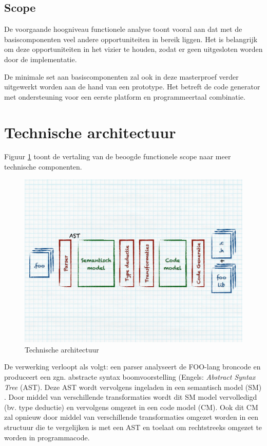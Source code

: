\subsection{Scope}
\label{subsection:arch-scope}

De voorgaande hoogniveau functionele analyse toont vooral aan dat met de
basiscomponenten veel andere opportuniteiten in bereik liggen. Het is
belangrijk om deze opportuniteiten in het vizier te houden, zodat er geen
uitgesloten worden door de implementatie.

De minimale set aan basiscomponenten zal ook in deze masterproef verder uitgewerkt
worden aan de hand van een prototype. Het betreft de code generator met
ondersteuning voor een eerste platform en programmeertaal combinatie.

\section{Technische architectuur}
\label{section:arch-technical}

Figuur \ref{fig:arch-technical} toont de vertaling van de beoogde functionele
scope naar meer technische componenten. 

\begin{figure}[ht]
  \centering
  \includegraphics[width=0.9\linewidth]{resources/arch-technical.pdf}
  \caption{Technische architectuur}
  \label{fig:arch-technical}
\end{figure}

De verwerking verloopt als volgt: een parser analyseert de FOO-lang broncode en
produceert een zgn. abstracte syntax boomvoorstelling (Engels: \emph{Abstract
Syntax Tree} (AST). Deze AST wordt vervolgens ingeladen in een semantisch model
(SM) \citep{fowler2010domain}. Door middel van verschillende transformaties
wordt dit SM model vervolledigd (bv. type deductie) en vervolgens omgezet in
een code model (CM). Ook dit CM zal opnieuw door middel van verschillende
transformaties omgezet worden in een structuur die te vergelijken is met een
AST en toelaat om rechtstreeks omgezet te worden in programmacode.

